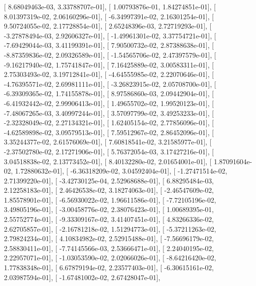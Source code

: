 \documentclass{article}
\begin{document}
       [  8.68049463e-03,   3.33788707e-01],
       [  1.00793876e-01,   1.84274851e-01],
       [  8.01397319e-02,   2.06160296e-01],
       [ -6.34997391e-02,   2.16301254e-01],
       [  9.50724055e-02,   2.17728854e-01],
       [  2.65248396e-03,   2.72719293e-01],
       [ -3.27878494e-03,   2.92606327e-01],
       [ -1.49961301e-02,   3.37754721e-01],
       [ -7.69429044e-03,   3.41199391e-01],
       [  7.90500732e-02,   2.87388638e-01],
       [ -8.87359836e-02,   2.09326589e-01],
       [ -1.54565706e-02,   2.47397579e-01],
       [ -9.16217940e-02,   1.75741847e-01],
       [  7.16425889e-02,   3.00583311e-01],
       [  2.75303493e-02,   3.19712841e-01],
       [ -4.64555985e-02,   2.22070646e-01],
       [ -4.76395571e-02,   2.69981111e-01],
       [ -3.26823915e-02,   2.05708700e-01],
       [ -6.39309365e-02,   1.74155878e-01],
       [  8.97586860e-03,   2.09442904e-01],
       [ -6.41932442e-02,   2.99906413e-01],
       [  1.49655702e-02,   1.99520123e-01],
       [ -7.48067265e-03,   3.40997244e-01],
       [  3.57097799e-02,   3.49253233e-01],
       [ -2.32328049e-02,   2.27134321e-01],
       [  1.62405154e-02,   2.77856096e-01],
       [ -4.62589898e-02,   3.09579513e-01],
       [  7.59512967e-02,   2.86452096e-01],
       [  3.35244377e-02,   2.61576069e-01],
       [  7.60818541e-02,   3.21585977e-01],
       [ -2.37502780e-02,   2.17271906e-01],
       [  5.76372054e-03,   3.17427216e-01],
       [  3.04518838e-02,   2.13773452e-01],
       [  8.40132280e-02,   2.01654001e-01],
       [  1.87091604e-02,   1.72880632e-01],
       [ -6.36318209e-02,   3.04592404e-01],
       [ -1.27471514e-02,   2.71399220e-01],
       [ -3.42730125e-04,   2.52968688e-01],
       [  6.88295484e-03,   2.12258183e-01],
       [  2.46426538e-02,   3.18274063e-01],
       [ -2.46547609e-02,   1.85578901e-01],
       [ -6.56930022e-02,   1.96611586e-01],
       [ -7.72105196e-02,   3.49805196e-01],
       [ -3.00458776e-02,   2.38076423e-01],
       [  1.00689395e-01,   2.55752774e-01],
       [ -9.33309167e-02,   3.41407451e-01],
       [  4.83266336e-02,   2.62705857e-01],
       [ -2.16781218e-02,   1.51294773e-01],
       [ -5.37211263e-02,   2.79824234e-01],
       [  4.10834982e-02,   2.52915488e-01],
       [ -7.56696179e-02,   2.58830411e-01],
       [ -7.74145566e-03,   2.53666471e-01],
       [  2.24040195e-02,   2.22957071e-01],
       [ -1.03053590e-02,   2.02066026e-01],
       [ -8.64216420e-02,   1.77838348e-01],
       [  6.67879194e-02,   2.23577403e-01],
       [ -6.30615161e-02,   2.03987594e-01],
       [ -1.67481002e-02,   2.67428047e-01],
\end{document}
